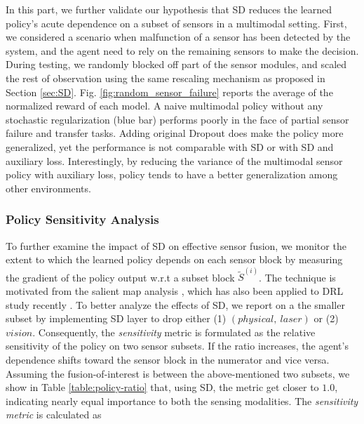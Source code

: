 \documentclass[../thesis.tex]{subfiles}
\begin{document}
In this part, we further validate our hypothesis that SD reduces the learned policy's acute dependence on a subset of sensors in a multimodal setting. First, we considered a scenario when malfunction of a sensor has been detected by the system, and the agent need to rely on the remaining sensors to make the decision. During testing, we randomly blocked off part of the sensor modules, and scaled the rest of observation using the same rescaling mechanism as proposed in Section \ref{sec:SD}. Fig. \ref{fig:random_sensor_failure} reports the average of the normalized reward of each model. A naive multimodal policy without any stochastic regularization (blue bar) performs poorly in the face of partial sensor failure and transfer tasks. Adding original Dropout does make the policy more generalized, yet the performance is not comparable with SD or with SD and auxiliary loss. Interestingly, by reducing the variance of the multimodal sensor policy with auxiliary loss, policy tends to have a better generalization among other environments.

\subsubsection{Policy Sensitivity Analysis}
To further examine the impact of SD on effective sensor fusion, we monitor the extent to which the learned policy depends on each sensor block by measuring the gradient of the policy output w.r.t a subset block $\tilde{S}^{(i)}$. The technique is motivated from the salient map analysis \cite{simonyan2013deep}, which has also been applied to DRL study recently \cite{WangFL15}. 
To better analyze the effects of SD, we report on a the smaller subset by implementing SD layer to drop either (1) $(physical,~ laser)$ or (2) $vision$. Consequently, the \emph{sensitivity} metric is formulated as the relative sensitivity of the policy on two sensor subsets. If the ratio increases, the agent's dependence shifts toward the sensor block in the numerator and vice versa. Assuming the fusion-of-interest is between the above-mentioned two subsets, we show in Table \ref{table:policy-ratio} that, using SD, the metric get closer to $1.0$, indicating nearly equal importance to both the sensing modalities. The \textit{sensitivity metric} is calculated as 
\end{document}
